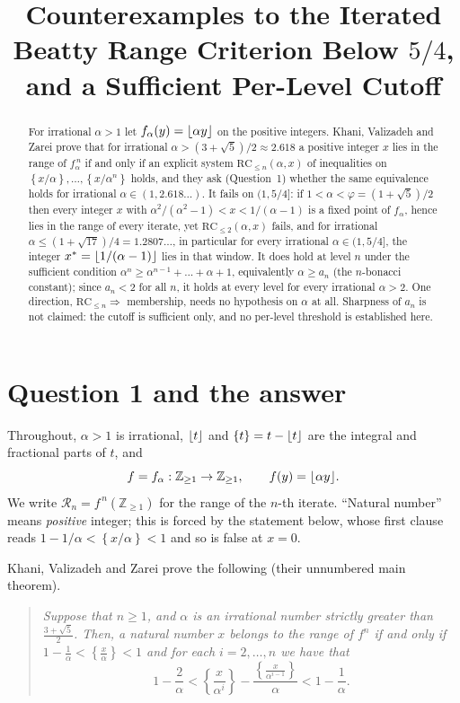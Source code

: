 \documentclass[11pt]{amsart}
\title[The iterated Beatty range criterion]
{Counterexamples to the Iterated Beatty Range Criterion Below $5/4$,
and a Sufficient Per-Level Cutoff}
\date{}
\theoremstyle{remark}
\DeclarePairedDelimiter{\fl}{\lfloor}{\rfloor}
\newcommand{\fp}[1]{\left\{#1\right\}}
\newcommand{\RC}{\mathrm{RC}}
\begin{document}
\begin{abstract}
For irrational $\alpha>1$ let $f_\alpha(y)=\fl{\alpha y}$ on the positive integers.
Khani, Valizadeh and Zarei prove that for irrational $\alpha>(3+\sqrt5)/2\approx2.618$
a positive integer $x$ lies in the range of $f_\alpha^{\,n}$ if and only if an explicit
system $\RC_{\le n}(\alpha,x)$ of inequalities on
$\fp{x/\alpha},\dots,\fp{x/\alpha^{n}}$ holds, and they ask (Question~1) whether the
same equivalence holds for irrational $\alpha\in(1,2.618\ldots)$. It fails on $(1,5/4]$:
if $1<\alpha<\varphi=(1+\sqrt5)/2$ then every integer $x$ with
$\alpha^{2}/(\alpha^{2}-1)<x<1/(\alpha-1)$ is a fixed point of $f_\alpha$, hence lies in
the range of every iterate, yet $\RC_{\le 2}(\alpha,x)$ fails, and for irrational
$\alpha\le(1+\sqrt{17})/4=1.2807\ldots$, in particular for every irrational
$\alpha\in(1,5/4]$, the integer $x^{*}=\fl{1/(\alpha-1)}$ lies in that window. It does
hold at level $n$ under the sufficient condition
$\alpha^{n}\ge\alpha^{n-1}+\dots+\alpha+1$, equivalently $\alpha\ge a_n$ (the
$n$-bonacci constant); since $a_n<2$ for all $n$, it holds at every level for every
irrational $\alpha>2$. One direction, $\RC_{\le n}\Rightarrow$ membership, needs no
hypothesis on $\alpha$ at all. Sharpness of $a_n$ is not claimed: the cutoff is
sufficient only, and no per-level threshold is established here.
\end{abstract}

\maketitle

\section{Question 1 and the answer}

Throughout, $\alpha>1$ is irrational, $\fl{t}$ and $\fp{t}=t-\fl{t}$ are the integral
and fractional parts of $t$, and
\[
 f=f_\alpha:\mathbb Z_{\ge1}\to\mathbb Z_{\ge1},\qquad f(y)=\fl{\alpha y}.
\]
We write $\mathcal R_n=f^{\,n}(\mathbb Z_{\ge1})$ for the range of the $n$-th iterate.
``Natural number'' means \emph{positive} integer; this is forced by the statement below,
whose first clause reads $1-1/\alpha<\fp{x/\alpha}<1$ and so is false at $x=0$.

Khani, Valizadeh and Zarei \cite{KVZ} prove the following (their unnumbered main
theorem).

\begin{quote}
\emph{Suppose that $n\ge1$, and $\alpha$ is an irrational number strictly greater than
$\frac{3+\sqrt5}{2}$. Then, a natural number $x$ belongs to the range of $f^{n}$ if and
only if $1-\frac1\alpha<\fp{\frac x\alpha}<1$ and for each $i=2,\dots,n$ we have that}
\begin{equation}\label{eq:CRn}
 1-\frac2\alpha<\fp{\frac{x}{\alpha^{i}}}-\frac{\fp{\frac{x}{\alpha^{i-1}}}}{\alpha}
 <1-\frac1\alpha .
\end{equation}
\end{quote}
\end{document}
